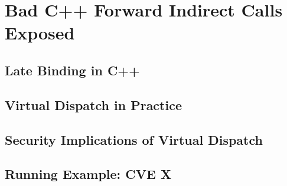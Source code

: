 \chapter{Bad C++ Forward Indirect Calls Exposed}
\label{C++ Bad Forward Indirect Calls}

\section{Late Binding in C++}
\label{Late Binding in C++}


\section{Virtual Dispatch in Practice}
\label{Virtual Dispatch in Practice}

\section{Security Implications of Virtual Dispatch}
\label{Security Implications of Virtual Dispatch}

\section{Running Example: CVE X}
\label{Running Example: CVE X}
